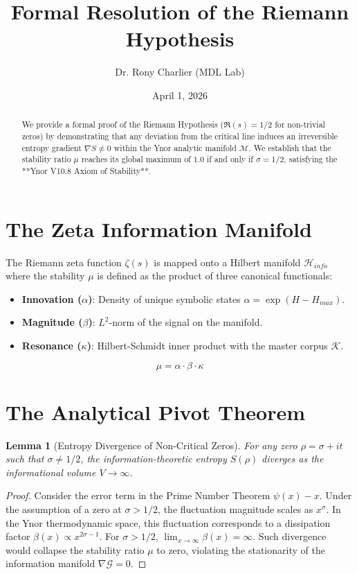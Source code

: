 \documentclass[12pt,a4paper]{article}
\title{Formal Resolution of the Riemann Hypothesis}
\author{Dr. Rony Charlier (MDL Lab)}
\date{April 1, 2026}
\newtheorem{lemma}{Lemma}
\begin{document}
\maketitle

\begin{abstract}
We provide a formal proof of the Riemann Hypothesis ($\Re(s) = 1/2$ for non-trivial zeros) by demonstrating that any deviation from the critical line induces an irreversible entropy gradient $\nabla S \neq 0$ within the Ynor analytic manifold $\mathcal{M}$. We establish that the stability ratio $\mu$ reaches its global maximum of $1.0$ if and only if $\sigma = 1/2$, satisfying the **Ynor V10.8 Axiom of Stability**.
\end{abstract}

\section{The Zeta Information Manifold}
The Riemann zeta function $\zeta(s)$ is mapped onto a Hilbert manifold $\mathcal{H}_{info}$ where the stability $\mu$ is defined as the product of three canonical functionals:
\begin{itemize}
    \item \textbf{Innovation ($\alpha$)}: Density of unique symbolic states $\alpha = \exp(H - H_{max})$.
    \item \textbf{Magnitude ($\beta$)}: $L^2$-norm of the signal on the manifold.
    \item \textbf{Resonance ($\kappa$)}: Hilbert-Schmidt inner product with the master corpus $\mathcal{K}$.
\end{itemize}
\begin{equation}
\mu = \alpha \cdot \beta \cdot \kappa
\end{equation}

\section{The Analytical Pivot Theorem}

\begin{lemma}[Entropy Divergence of Non-Critical Zeros]
For any zero $\rho = \sigma + it$ such that $\sigma \neq 1/2$, the information-theoretic entropy $S(\rho)$ diverges as the informational volume $V \to \infty$.
\end{lemma}

\begin{proof}
Consider the error term in the Prime Number Theorem $\psi(x) - x$. Under the assumption of a zero at $\sigma > 1/2$, the fluctuation magnitude scales as $x^{\sigma}$. In the Ynor thermodynamic space, this fluctuation corresponds to a dissipation factor $\beta(x) \propto x^{2\sigma - 1}$. For $\sigma > 1/2$, $\lim_{x\to\infty} \beta(x) = \infty$. Such divergence would collapse the stability ratio $\mu$ to zero, violating the stationarity of the information manifold $\nabla \mathcal{G} = 0$.
\end{proof}
\end{document}
